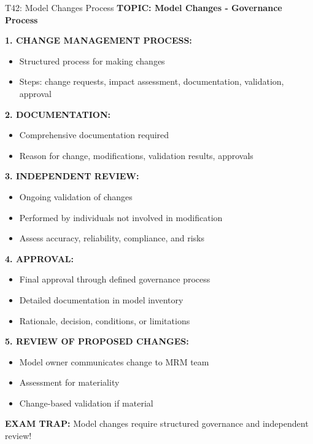 \documentclass[8pt]{beamer}
\begin{document}
	\begin{frame}{T42: Model Changes Process}
		\fontsize{6.5}{7.5}\selectfont
		\textbf{TOPIC: Model Changes - Governance Process}
		
		\vspace{0.1cm}
		\textbf{1. CHANGE MANAGEMENT PROCESS:}
		\begin{itemize}
			\item Structured process for making changes
			\item Steps: change requests, impact assessment, documentation, validation, approval
		\end{itemize}
		
		\vspace{0.1cm}
		\textbf{2. DOCUMENTATION:}
		\begin{itemize}
			\item Comprehensive documentation required
			\item Reason for change, modifications, validation results, approvals
		\end{itemize}
		
		\vspace{0.1cm}
		\textbf{3. INDEPENDENT REVIEW:}
		\begin{itemize}
			\item Ongoing validation of changes
			\item Performed by individuals not involved in modification
			\item Assess accuracy, reliability, compliance, and risks
		\end{itemize}
		
		\vspace{0.1cm}
		\textbf{4. APPROVAL:}
		\begin{itemize}
			\item Final approval through defined governance process
			\item Detailed documentation in model inventory
			\item Rationale, decision, conditions, or limitations
		\end{itemize}
		
		\vspace{0.1cm}
		\textbf{5. REVIEW OF PROPOSED CHANGES:}
		\begin{itemize}
			\item Model owner communicates change to MRM team
			\item Assessment for materiality
			\item Change-based validation if material
		\end{itemize}
		
		\textcolor{myred}{\textbf{EXAM TRAP:}} Model changes require \textcolor{myblue}{structured governance and independent review}!
	\end{frame}
	
\end{document}
